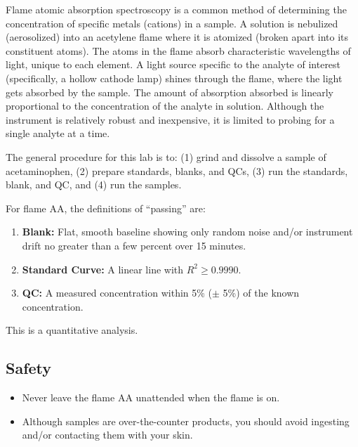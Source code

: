 \documentclass[]{tufte-book}
\providecommand{\tightlist}{%
  \setlength{\itemsep}{0pt}\setlength{\parskip}{0pt}}
\begin{document}
Flame atomic absorption spectroscopy is a common method of determining the concentration of specific metals (cations) in a sample. A solution is nebulized (aerosolized) into an acetylene flame where it is atomized (broken apart into its constituent atoms). The atoms in the flame absorb characteristic wavelengths of light, unique to each element. A light source specific to the analyte of interest (specifically, a hollow cathode lamp) shines through the flame, where the light gets absorbed by the sample. The amount of absorption absorbed is linearly proportional to the concentration of the analyte in solution. Although the instrument is relatively robust and inexpensive, it is limited to probing for a single analyte at a time.

The general procedure for this lab is to: (1) grind and dissolve a sample of acetaminophen, (2) prepare standards, blanks, and QCs, (3) run the standards, blank, and QC, and (4) run the samples.

For flame AA, the definitions of ``passing'' are:

\begin{enumerate}
\def\labelenumi{\arabic{enumi}.}
\tightlist
\item
  \textbf{Blank:} Flat, smooth baseline showing only random noise and/or instrument drift no greater than a few percent over 15 minutes.\\
\item
  \textbf{Standard Curve:} A linear line with \(R^2 \ge 0.9990\).\\
\item
  \textbf{QC:} A measured concentration within 5\% (\(\pm\) 5\%) of the known concentration.
\end{enumerate}

This is a quantitative analysis.

\hypertarget{safety-8}{%
\subsection*{Safety}\label{safety-8}}

\begin{itemize}
\tightlist
\item
  Never leave the flame AA unattended when the flame is on.\\
\item
  Although samples are over-the-counter products, you should avoid ingesting and/or contacting them with your skin.
\end{itemize}
\end{document}
